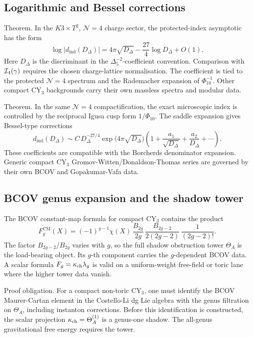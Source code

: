 \subsection*{Logarithmic and Bessel corrections}

Theorem. In the \(K3\times T^2\), \(\mathcal N=4\) charge sector, the
protected-index asymptotic has the form
\[
\log |d_{\mathrm{ind}}(D_\Delta)|
=4\pi\sqrt{D_\Delta}
-\frac{27}{4}\log D_\Delta+O(1).
\]
Here \(D_\Delta\) is the discriminant in the
\(\Delta_5^{-2}\)-coefficient convention. Comparison with
\(\mathcal{I}_4(\gamma)\) requires the chosen charge-lattice normalisation. The
coefficient is tied to the protected \(\mathcal N=4\) spectrum and the
Rademacher expansion of \(\Phi_{10}^{-1}\). Other compact CY\(_3\)
backgrounds carry their own massless spectra and modular data.

Theorem. In the same \(\mathcal N=4\) compactification, the exact
microscopic index is controlled by the reciprocal Igusa cusp form
\(1/\Phi_{10}\). The saddle expansion gives Bessel-type corrections
\[
d_{\mathrm{ind}}(D_\Delta)\sim
C\,D_\Delta^{-27/4}
\exp\bigl(4\pi\sqrt{D_\Delta}\bigr)
\left(1+\frac{a_1}{\sqrt{D_\Delta}}+
\frac{a_2}{D_\Delta}+\cdots\right).
\]
These coefficients are compatible with the Borcherds denominator
expansion. Generic compact CY\(_3\) Gromov-Witten/Donaldson-Thomas
series are governed by their own BCOV and Gopakumar-Vafa data.

\subsection*{BCOV genus expansion and the shadow tower}

The BCOV constant-map formula for compact CY\(_3\) contains the product
\[
F_g^{\mathrm{CM}}(X)
=(-1)^{g-1}\chi(X)\,
\frac{B_{2g}}{2g}\,
\frac{B_{2g-2}}{2(2g-2)}\,
\frac{1}{(2g-2)!}.
\]
The factor \(B_{2g-2}/B_{2g}\) varies with \(g\), so the full shadow
obstruction tower \(\Theta_A\) is the load-bearing object. Its
\(g\)-th component carries the \(g\)-dependent BCOV data. A scalar formula
\(F_g=\kappa_{\mathrm{ch}}\lambda_g\) is valid on a uniform-weight free-field or
toric lane where the higher tower data vanish.

Proof obligation. For a compact non-toric CY\(_3\), one must identify
the BCOV Maurer-Cartan element in the Costello-Li dg Lie algebra with
the genus filtration on \(\Theta_A\), including instanton corrections.
Before this identification is constructed, the scalar projection
\(\kappa_{\mathrm{ch}}=\Theta_A^{(1)}\) is a genus-one shadow. The all-genus
gravitational free energy requires the tower.

